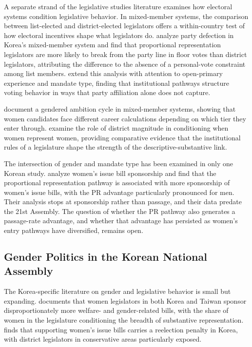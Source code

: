 \documentclass[11pt]{article}
\begin{document}
A separate strand of the legislative studies literature examines how electoral systems condition legislative behavior. In mixed-member systems, the comparison between list-elected and district-elected legislators offers a within-country test of how electoral incentives shape what legislators do. \citet{junHix2010} analyze party defection in Korea's mixed-member system and find that proportional representation legislators are more likely to break from the party line in floor votes than district legislators, attributing the difference to the absence of a personal-vote constraint among list members. \citet{kimPark2022} extend this analysis with attention to open-primary experience and mandate type, finding that institutional pathways structure voting behavior in ways that party affiliation alone does not capture.

\citet{coffeDavidsonSchmich2019} document a gendered ambition cycle in mixed-member systems, showing that women candidates face different career calculations depending on which tier they enter through. \citet{crispCunhaSilva2022} examine the role of district magnitude in conditioning when women represent women, providing comparative evidence that the institutional rules of a legislature shape the strength of the descriptive-substantive link.

The intersection of gender and mandate type has been examined in only one Korean study. \citet{kweonRyan2021} analyze women's issue bill sponsorship and find that the proportional representation pathway is associated with more sponsorship of women's issue bills, with the PR advantage particularly pronounced for men. Their analysis stops at sponsorship rather than passage, and their data predate the 21st Assembly. The question of whether the PR pathway also generates a passage-rate advantage, and whether that advantage has persisted as women's entry pathways have diversified, remains open.

\subsection{Gender Politics in the Korean National Assembly}

The Korea-specific literature on gender and legislative behavior is small but expanding. \citet{shim2021a} documents that women legislators in both Korea and Taiwan sponsor disproportionately more welfare- and gender-related bills, with the share of women in the legislature conditioning the breadth of substantive representation. \citet{shim2021b} finds that supporting women's issue bills carries a reelection penalty in Korea, with district legislators in conservative areas particularly exposed.
\end{document}
